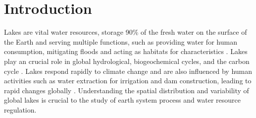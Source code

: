 \documentclass[preprint,12pt,authoryear]{elsarticle}
\begin{document}

\section{Introduction}
\label{sec1}

Lakes are vital water resources, storage 90\% of the fresh water on the surface of the Earth and serving multiple functions, such as providing water for human consumption, mitigating floods and acting as habitats for characteristics \citep{reynaud_global_2017}. Lakes play an crucial role in global hydrological, biogeochemical cycles, and the carbon cycle \citep{lehner_development_2004,verpoorter_global_2014}. Lakes respond rapidly to climate change and are also influenced by human activities such as water extraction for irrigation and dam construction, leading to rapid changes globally \citep{williamson_lakes_2009,pi_mapping_2022}. Understanding the spatial distribution and variability of global lakes is crucial to the study of earth system process and water resource regulation. 
\end{document}
